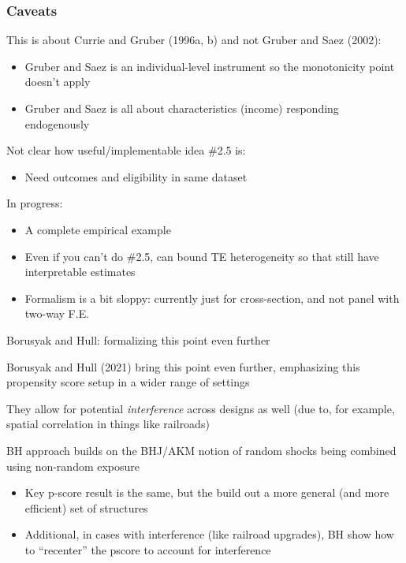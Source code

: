 \documentclass[notes,11pt, aspectratio=169]{beamer}
\newenvironment{wideitemize}{\itemize\addtolength{\itemsep}{10pt}}{\enditemize}
\begin{document}
\begin{frame}
\frametitle{Caveats}

This is about Currie and Gruber (1996a, b) and not Gruber and Saez (2002):
\begin{itemize}
\item Gruber and Saez is an individual-level instrument so the monotonicity point doesn't apply
\item Gruber and Saez is all about characteristics (income) responding endogenously
\end{itemize} 
Not clear how useful/implementable idea \#2.5 is:
\begin{itemize}
\item Need outcomes and eligibility in same dataset
\end{itemize} 
In progress:
\begin{itemize}
\item A complete empirical example
\item Even if you can't do \#2.5, can bound TE heterogeneity so that still have interpretable estimates
\item Formalism is a bit sloppy: currently just for cross-section, and not panel with two-way F.E.
\end{itemize}

\end{frame}

\begin{frame}{Borusyak and Hull: formalizing this point even further}
  \begin{wideitemize}
  \item Borusyak and Hull (2021) bring this point even further,
    emphasizing this propensity score setup in a wider range of settings
  \item They allow for potential \emph{interference} across designs as well (due to, for example, spatial correlation in things like railroads)
  \item BH approach builds on the BHJ/AKM notion of random shocks
    being combined using non-random exposure
    \begin{itemize}
    \item Key p-score result is the same, but the build out a more
      general (and more efficient) set of structures
    \item Additional, in cases with interference (like railroad
      upgrades), BH show how to ``recenter'' the pscore to account for
      interference
    \end{itemize}
  \end{wideitemize}
\end{frame}
\end{document}
